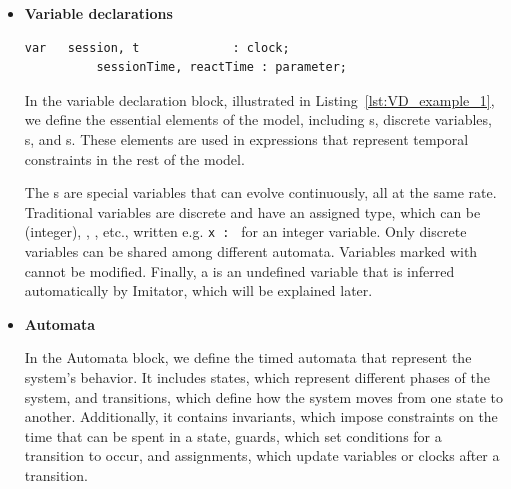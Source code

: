 \begin{itemize}
    \item \textbf{Variable declarations}

    \begin{lstlisting}[language=UPPAAL, caption={Variable Declaration Exemple using Worker Automata}, label={lst:VD_example_1}, float={bt}]
    var   session, t             : clock;
          sessionTime, reactTime : parameter;   
    \end{lstlisting}

    In the variable declaration block, illustrated in Listing~\ref{lst:VD_example_1},
    we define the essential elements of the model, including s, discrete variables, s, and s. These elements are used in expressions that represent temporal constraints in the rest of the model.

    The s are special variables that can evolve continuously, all at the same rate.
    Traditional variables are discrete and have an assigned type, which can be  (integer), , , etc., written e.g. \texttt{x : } for an integer variable. Only discrete variables can be shared among different automata. Variables marked with  cannot be modified.
    Finally, a  is an undefined variable that is inferred automatically by Imitator, which will be explained later.





    \item \textbf{Automata}

    In the Automata block, we define the timed automata that represent the system's behavior. It includes states, which represent different phases of the system, and transitions, which define how the system moves from one state to another. Additionally, it contains invariants, which impose constraints on the time that can be spent in a state, guards, which set conditions for a transition to occur, and assignments, which update variables or clocks after a transition.


\end{itemize}
